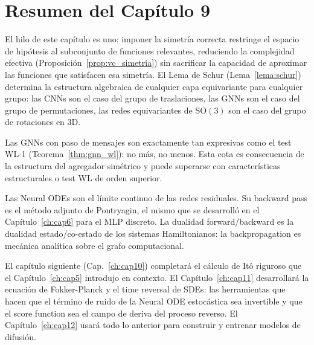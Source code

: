 \section{Resumen del Capítulo 9}
\label{sec:resumen9}

El hilo de este capítulo es uno: imponer la simetría correcta restringe el
espacio de hipótesis al subconjunto de funciones relevantes, reduciendo la
complejidad efectiva (Proposición~\ref{prop:vc_simetria}) sin sacrificar la
capacidad de aproximar las funciones que satisfacen esa simetría. El Lema de
Schur (Lema~\ref{lema:schur}) determina la estructura algebraica de cualquier
capa equivariante para cualquier grupo: las CNNs son el caso del grupo de
traslaciones, las GNNs son el caso del grupo de permutaciones, las redes
equivariantes de $\mathrm{SO}(3)$ son el caso del grupo de rotaciones en 3D.

Las GNNs con paso de mensajes son exactamente tan expresivas como el test WL-1
(Teorema~\ref{thm:gnn_wl}): no más, no menos. Esta cota es consecuencia de la
estructura del agregador simétrico y puede superarse con características
estructurales o test WL de orden superior.

Las Neural ODEs son el límite continuo de las redes residuales. Su backward
pass es el método adjunto de Pontryagin, el mismo que se desarrolló en el
Capítulo~\ref{ch:cap6} para el MLP discreto. La dualidad forward/backward es la dualidad
estado/co-estado de los sistemas Hamiltonianos: la backpropagation es mecánica
analítica sobre el grafo computacional.

El capítulo siguiente (Cap.~\ref{ch:cap10}) completará el cálculo de Itô riguroso que el
Capítulo~\ref{ch:cap5} introdujo en contexto. El Capítulo~\ref{ch:cap11} desarrollará la ecuación de
Fokker-Planck y el time reversal de SDEs: las herramientas que hacen que el
término de ruido de la Neural ODE estocástica sea invertible y que el score
function sea el campo de deriva del proceso reverso. El Capítulo~\ref{ch:cap12} usará
todo lo anterior para construir y entrenar modelos de difusión.

